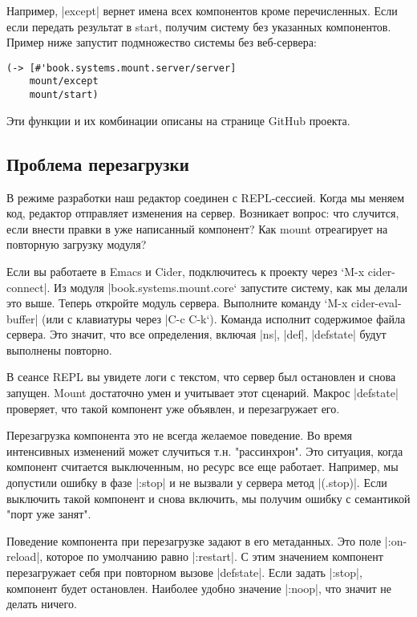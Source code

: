 Например, \spverb|except| вернет имена всех компонентов кроме перечисленных. Если если
передать результат в start, получим систему без указанных компонентов. Пример
ниже запустит подмножество системы без веб-сервера:

\begin{verbatim}
(-> [#'book.systems.mount.server/server]
    mount/except
    mount/start)
\end{verbatim}

Эти функции и их комбинации описаны на странице GitHub проекта.

\subsection{Проблема перезагрузки}

В режиме разработки наш редактор соединен с REPL-сессией. Когда мы меняем код,
редактор отправляет изменения на сервер. Возникает вопрос: что случится, если
внести правки в уже написанный компонент? Как mount отреагирует на повторную
загрузку модуля?

Если вы работаете в Emacs и Cider, подключитесь к проекту через `M-x
cider-connect\spverb|. Из модуля |book.systems.mount.core` запустите систему, как мы
делали это выше. Теперь откройте модуль сервера. Выполните команду `M-x
cider-eval-buffer\spverb| (или с клавиатуры через |C-c C-k`). Команда исполнит
содержимое файла сервера. Это значит, что все определения, включая \spverb|ns|, \spverb|def|,
\spverb|defstate| будут выполнены повторно.

В сеансе REPL вы увидете логи с текстом, что сервер был остановлен и снова
запущен. Mount достаточно умен и учитывает этот сценарий. Макрос \spverb|defstate|
проверяет, что такой компонент уже объявлен, и перезагружает его.

Перезагрузка компонента это не всегда желаемое поведение. Во время интенсивных
изменений может случиться т.н. "рассинхрон". Это ситуация, когда компонент
считается выключенным, но ресурс все еще работает. Например, мы допустили ошибку
в фазе \spverb|:stop| и не вызвали у сервера метод \spverb|(.stop)|. Если выключить такой
компонент и снова включить, мы получим ошибку с семантикой "порт уже занят".

Поведение компонента при перезагрузке задают в его метаданных. Это поле
\spverb|:on-reload|, которое по умолчанию равно \spverb|:restart|. С этим значением компонент
перезагружает себя при повторном вызове \spverb|defstate|. Если задать \spverb|:stop|,
компонент будет остановлен. Наиболее удобно значение \spverb|:noop|, что значит не
делать ничего.

